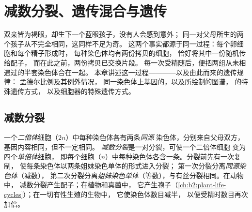 \chapter{减数分裂、遗传混合与遗传}\label{ch:b2:meiosis-heredity}

双亲皆为褐眼，却生下一个蓝眼孩子，没有人会感到意外；
同一对父母所生的两个孩子从不完全相同，这同样不足为奇。
这两个事实都源于同一过程：每个卵细胞和每个精子形成时，
每种染色体均有两份拷贝的细胞，
恰好将其中一份随机传给配子，
而在此之前，两份拷贝已交换片段。
每一次受精随后，便把两组从未相遇过的半套染色体合在一起。
本章讲述这一过程————以及由此而来的遗传规律：
孟德尔比例及其例外情况，
同一染色体上基因的，以及所绘制的图谱，
的特殊遗传方式，
以及细胞器的特殊遗传方式。

\section{减数分裂}

\begin{definition}[减数分裂]\label{def:b2:meiosis-heredity:meiosis}
一个\emph{二倍体}细胞（$2n$）中每种染色体各有两条\emph{同源}
染色体，分别来自父母双方，基因内容相同，但不一定相同。
\emph{减数分裂}是一对分裂，可使一个二倍体细胞
变为四个\emph{单倍体}细胞，
即每个细胞（$n$）中每种染色体各含一条。分裂前先有一次复制，
使每条染色体以两条姐妹染色单体的形式进入分裂；
第一次分裂分离\emph{同源染色体}（减数），
第二次分裂分离\emph{姐妹染色单体}（等数），与有丝分裂相同。在动物中，
减数分裂产生配子；在植物和真菌中，
它产生孢子（\cref{ch:b2:plant-life-cycles}）；在一切有性生殖的生物中，
它使染色体数目减半，
以便受精时数目再次加倍。
\end{definition}

